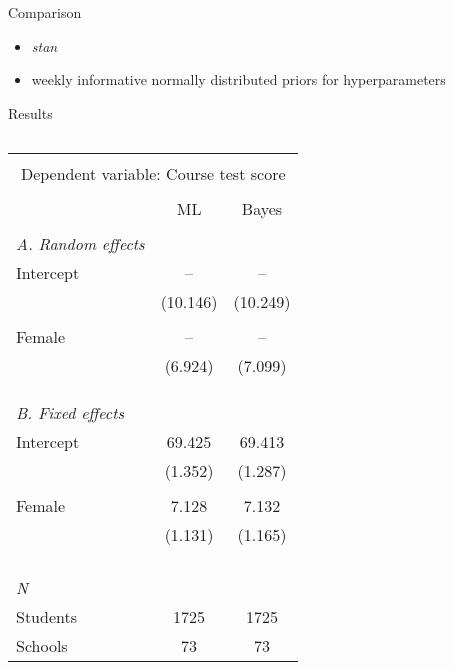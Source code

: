 \begin{frame}{Comparison}
	\Large{
		\begin{itemize}
			\item[]  \textit{stan}
			\item[]  weekly informative normally distributed priors for hyperparameters

		\end{itemize}
	}
\end{frame}

\begin{frame}{Results}
	\Large{
			\begin{columns}

				\begin{column}{0.7\textwidth}
					\begin{table}
						\footnotesize
						\begin{tabular}{l*{2}{c}}
							\toprule \\[-1.0em]
							\multicolumn{3}{c}{Dependent variable: Course test score}\\ \\[-1.0em]
							&ML &Bayes\\ \midrule \\[-1.0em]
							\emph{A. Random effects} \\
							Intercept & -- & --\\
							& (10.146) & (10.249)\\ \\[-1.0em]
							Female & -- & --\\
							& (6.924) & (7.099)\\ \\[-1.0em]
							\\ \\[-1.0em]\emph{B. Fixed effects} \\
							Intercept & 69.425 & 69.413\\
							& (1.352) & (1.287)\\ \\[-1.0em]
							Female & 7.128 & 7.132\\
							& (1.131) & (1.165)\\ \\[-1.0em]
							\\ \\[-1.0em]\hline \\[-1.0em]
							\emph{N} \\
							\hspace{3mm}Students&1725&1725\\
							\hspace{3mm}Schools&73&73\\
							\bottomrule
						\end{tabular}
					\end{table}
				\end{column}


\end{columns}}
\end{frame}
